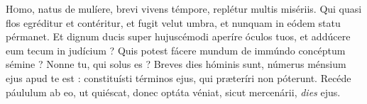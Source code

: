 \lettrine{H}omo, natus de mulíere, brevi vivens témpore, replétur multis misériis.
Qui quasi flos egréditur et contéritur, et fugit velut umbra, et nunquam in eódem statu pérmanet.
Et dignum ducis super hujuscémodi aperíre óculos tuos, et addúcere eum tecum in judícium ?
Quis potest fácere mundum de immúndo concéptum sémine ? Nonne tu, qui solus es ?
Breves dies hóminis sunt, númerus ménsium ejus apud te est : constituísti términos ejus, qui præteríri non póterunt.
Recéde páululum ab eo, ut quiéscat, donec optáta véniat, sicut mercenárii, \textit{dies} ejus.